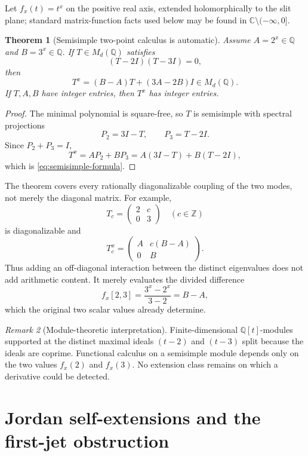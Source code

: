 \documentclass[11pt,oneside]{article}
\newtheorem{theorem}{Theorem}[section]
\theoremstyle{definition}
\theoremstyle{remark}
\newtheorem{remark}[theorem]{Remark}
\newcommand{\Z}{\mathbb Z}
\newcommand{\Q}{\mathbb Q}
\newcommand{\C}{\mathbb C}
\begin{document}
Let \(f_x(t)=t^x\) on the positive real axis, extended holomorphically
to the slit plane; standard matrix-function facts used below may be
found in \cite{Higham} \(\C\setminus(-\infty,0]\).

\begin{theorem}[Semisimple two-point calculus is automatic]
\label{thm:semisimple-blind}
Assume \(A=2^x\in\Q\) and \(B=3^x\in\Q\).  If
\(T\in M_d(\Q)\) satisfies
\[
        (T-2I)(T-3I)=0,
\]
then
\begin{equation}\label{eq:semisimple-formula}
        T^x=(B-A)T+(3A-2B)I\in M_d(\Q).
\end{equation}
If \(T,A,B\) have integer entries, then \(T^x\) has integer entries.
\end{theorem}

\begin{proof}
The minimal polynomial is square-free, so \(T\) is semisimple with
spectral projections
\[
        P_2=3I-T,\qquad P_3=T-2I.
\]
Since \(P_2+P_3=I\),
\[
        T^x=AP_2+BP_3
        =A(3I-T)+B(T-2I),
\]
which is \eqref{eq:semisimple-formula}.
\end{proof}

The theorem covers every rationally diagonalizable coupling of the two
modes, not merely the diagonal matrix.  For example,
\[
        T_c=\begin{pmatrix}2&c\\0&3\end{pmatrix}
        \quad(c\in\Z)
\]
is diagonalizable and
\[
        T_c^x=
        \begin{pmatrix}
          A&c(B-A)\\0&B
        \end{pmatrix}.
\]
Thus adding an off-diagonal interaction between the distinct eigenvalues
does not add arithmetic content.  It merely evaluates the divided
difference
\[
        f_x[2,3]=\frac{3^x-2^x}{3-2}=B-A,
\]
which the original two scalar values already determine.

\begin{remark}[Module-theoretic interpretation]
Finite-dimensional \(\Q[t]\)-modules supported at the distinct maximal
ideals \((t-2)\) and \((t-3)\) split because the ideals are coprime.
Functional calculus on a semisimple module depends only on the two
values \(f_x(2)\) and \(f_x(3)\).  No extension class remains on which a
derivative could be detected.
\end{remark}

\section{Jordan self-extensions and the first-jet obstruction}
\end{document}
